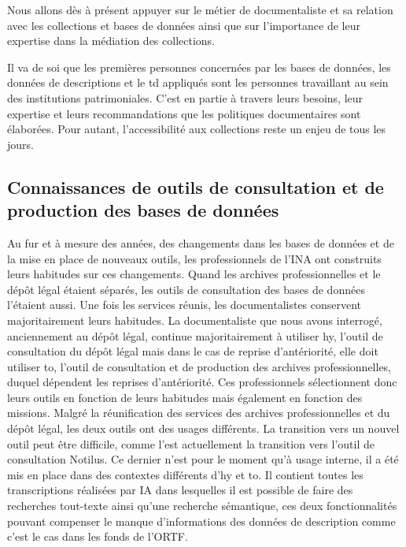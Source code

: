 
Nous allons dès à présent appuyer sur le métier de documentaliste et sa relation avec les collections et bases de données ainsi que sur l'importance de leur expertise dans la médiation des collections.


Il va de soi que les premières personnes concernées par les bases de données, les données de descriptions et le \gls{td} appliqués sont les personnes travaillant au sein des institutions patrimoniales. C'est en partie à travers leurs besoins, leur expertise et leurs recommandations que les politiques documentaires sont élaborées. Pour autant, l’accessibilité aux collections reste un enjeu de tous les jours. 

\subsection{Connaissances de outils de consultation et de production des bases de données}


Au fur et à mesure des années, des changements dans les bases de données et de la mise en place de nouveaux outils, les professionnels de l'INA ont construits leurs habitudes sur ces changements. Quand les archives professionnelles et le dépôt légal étaient séparés, les outils de consultation des bases de données l'étaient aussi. Une fois les services réunis, les documentalistes conservent majoritairement leurs habitudes. La documentaliste que nous avons interrogé, anciennement au dépôt légal, continue majoritairement à utiliser \gls{hy}, l'outil de consultation du dépôt légal mais dans le cas de reprise d'antériorité, elle doit utiliser \gls{to}, l'outil de consultation et de production des archives professionnelles, duquel dépendent les reprises d'antériorité. Ces professionnels sélectionnent donc leurs outils en fonction de leurs habitudes mais également en fonction des missions. Malgré la réunification des services des archives professionnelles et du dépôt légal, les deux outils ont des usages différents. La transition vers un nouvel outil peut être difficile, comme l'est actuellement la transition vers l'outil de consultation Notilus. Ce dernier n'est pour le moment qu'à usage interne, il a été mis en place dans des contextes différents d'\gls{hy} et \gls{to}. Il contient toutes les transcriptions réalisées par IA dans lesquelles il est possible de faire des recherches tout-texte ainsi qu'une recherche sémantique, ces deux fonctionnalités pouvant compenser le manque d'informations des données de description comme c'est le cas dans les fonds de l'ORTF.

